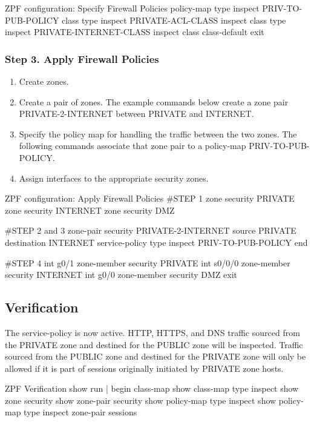 \begin{sexylisting}{ZPF configuration: Specify Firewall Policies}
policy-map type inspect PRIV-TO-PUB-POLICY
  class type inspect PRIVATE-ACL-CLASS   
  inspect    
  class type inspect PRIVATE-INTERNET-CLASS
  inspect
  class class-default
exit  
\end{sexylisting}

\subsubsection{Step 3. Apply Firewall Policies}

\begin{enumerate}
\item Create zones.
\item Create a pair of zones. The example commands below create a zone pair PRIVATE-2-INTERNET between PRIVATE and INTERNET.
\item Specify the policy map for handling the traffic between the two zones. The following commands associate that zone pair to a policy-map PRIV-TO-PUB-POLICY.
\item Assign interfaces to the appropriate security zones.
\end{enumerate}


\begin{sexylisting}{ZPF configuration: Apply Firewall Policies}
#STEP 1
zone security PRIVATE
zone security INTERNET
zone security DMZ

#STEP 2 and 3
zone-pair security PRIVATE-2-INTERNET source PRIVATE destination INTERNET
  service-policy type inspect  PRIV-TO-PUB-POLICY
end

#STEP 4
int g0/1
  zone-member security PRIVATE
int s0/0/0
  zone-member security INTERNET    
int g0/0
  zone-member security DMZ
exit
\end{sexylisting}

\subsection{Verification}

The service-policy is now active. HTTP, HTTPS, and DNS traffic sourced from the PRIVATE zone and destined for the PUBLIC zone will be inspected. Traffic sourced from the PUBLIC zone and destined for the PRIVATE zone will only be allowed if it is part of sessions originally initiated by PRIVATE zone hosts.

\begin{sexylisting}{ZPF Verification}
show run | begin class-map
show class-map type inspect
show zone security
show zone-pair security
show policy-map type inspect
show policy-map type inspect zone-pair sessions
\end{sexylisting}



